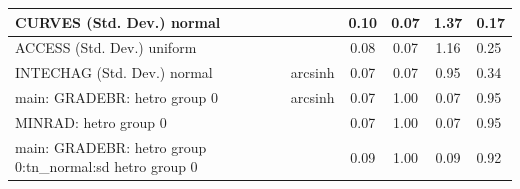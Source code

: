 \begin{table}
\begin{center}
\begin{tabular}{|l|l|c|c|c|l|}
			\hline
			CURVES (Std. Dev.) normal &  & 0.10 & 0.07 & 1.37 & 0.17 \\
			\hline
			ACCESS (Std. Dev.) uniform &  & 0.08 & 0.07 & 1.16 & 0.25 \\
			\hline
			INTECHAG (Std. Dev.) normal & arcsinh & 0.07 & 0.07 & 0.95 & 0.34 \\
			\hline
			main: GRADEBR: hetro group 0 & arcsinh & 0.07 & 1.00 & 0.07 & 0.95 \\
			\hline
			MINRAD: hetro group 0 &  & 0.07 & 1.00 & 0.07 & 0.95 \\
			\hline
			main: GRADEBR: hetro group 0:tn_normal:sd  hetro group 0 &  & 0.09 & 1.00 & 0.09 & 0.92 \\
			\hline
		\end{tabular}
	\end{center}
\end{table}